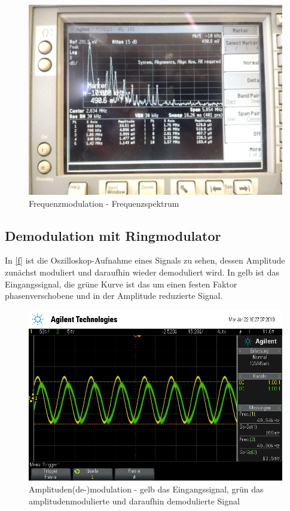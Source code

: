 \begin{figure}
	\centering
	\includegraphics[width=\textwidth]{img/Aufgabenteil_d.jpg}
	\caption{Frequenzmodulation - Frequenzspektrum}
\end{figure}

\subsection{Demodulation mit Ringmodulator}


In \autoref{f} ist die Oszilloskop-Aufnahme eines Signals zu sehen, dessen Amplitude zunächst moduliert und daraufhin wieder demoduliert wird. In gelb ist das Eingangssignal, die grüne Kurve ist das um einen festen Faktor phasenverschobene und in der Amplitude reduzierte Signal.

\begin{figure}
	\centering
	\includegraphics[width=\textwidth]{img/f_scope_235.png}
	\caption{Amplituden(de-)modulation - gelb das Eingangssignal, grün das amplitudenmodulierte und daraufhin demodulierte Signal}
	\label{f}
\end{figure}

